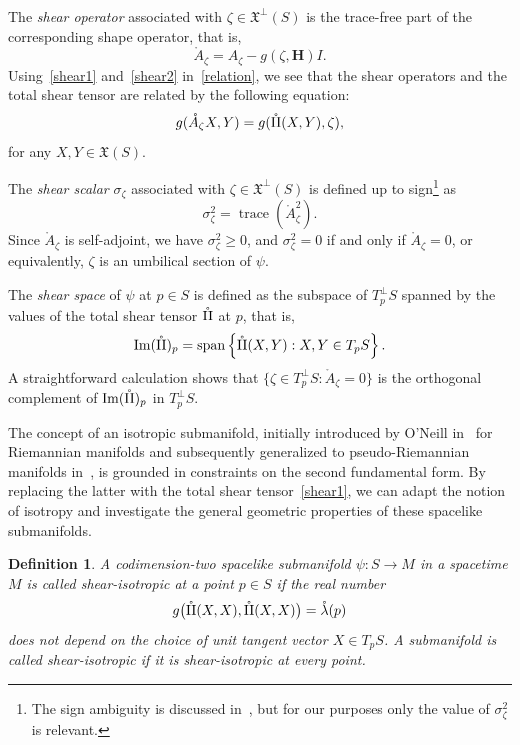 \documentclass[11pt]{article}
\numberwithin{equation}{section}
\newtheorem{definition}[theorem]{Definition}
\begin{document}
	The \emph{shear operator} associated with $\zeta \in {\mathfrak X}^\perp(S)$ is the trace-free part of the corresponding shape operator, that is,
	\begin{equation}\label{shear2}
		\mathring{A}_\zeta = A_\zeta - g(\zeta, \mathbf{H}) I.
	\end{equation}
	Using~\eqref{shear1} and~\eqref{shear2} in~\eqref{relation}, we see that the shear operators and the total shear tensor are related by the following equation:
	\begin{equation}\label{shear3}
		g(\mathring{A}_\zeta X, Y) = g(\mathring{\rm II}(X,Y), \zeta),
	\end{equation}
	for any $X, Y \in {\mathfrak X}(S)$.
	
	The \emph{shear scalar} $\sigma_\zeta$ associated with $\zeta \in {\mathfrak X}^\perp(S)$ is defined up to sign\footnote{The sign ambiguity is discussed in~\cite{cipriani, Senovilla}, but for our purposes only the value of $\sigma_\zeta^2$ is relevant.} as~\cite{Senovilla}
	\[
	\sigma_\zeta^2 = \operatorname{trace}(\mathring{A}_\zeta^2).
	\]
	Since $\mathring{A}_\zeta$ is self-adjoint, we have $\sigma_\zeta^2 \geq 0$, and $\sigma_\zeta^2 = 0$ if and only if $\mathring{A}_\zeta = 0$, or equivalently, $\zeta$ is an umbilical section of $\psi$.
	
	The \emph{shear space} of $\psi$ at $p \in S$ is defined as the subspace of $T_p^\perp S$ spanned by the values of the total shear tensor $\mathring{\rm II}$ at $p$, that is,
	\[
	\operatorname{Im}(\mathring{\rm II})_p = \operatorname{span}\left\{ \mathring{\rm II}(X,Y) : X, Y \in T_p S \right\}.
	\]
	A straightforward calculation shows that $\{\zeta \in T_p^\perp S : \mathring{A}_\zeta = 0\}$ is the orthogonal complement of $\mathrm{Im}(\mathring{\rm II})_p$ in $T_p^\perp S$.
	
	The concept of an isotropic submanifold, initially introduced by O'Neill in~\cite{oneill2} for Riemannian manifolds and subsequently generalized to pseudo-Riemannian manifolds in~\cite{Cab3}, is grounded in constraints on the second fundamental form. By replacing the latter with the total shear tensor~\eqref{shear1}, we can adapt the notion of isotropy and investigate the general geometric properties of these spacelike submanifolds.
	
	\begin{definition}\label{def:Shear_isotropy}\normalfont
		A codimension-two spacelike submanifold $\psi \colon S \to M$ in a spacetime $M$ is called \emph{shear-isotropic at a point} $p \in S$ if the real number
		\[
		g\bigl( \mathring{\rm II}(X,X), \mathring{\rm II}(X,X)\bigr) = \mathring{\lambda}(p)
		\]
		does not depend on the choice of unit tangent vector $X \in T_p S$. A submanifold is called \emph{shear-isotropic} if it is shear-isotropic at every point.
	\end{definition}
	
\end{document}
